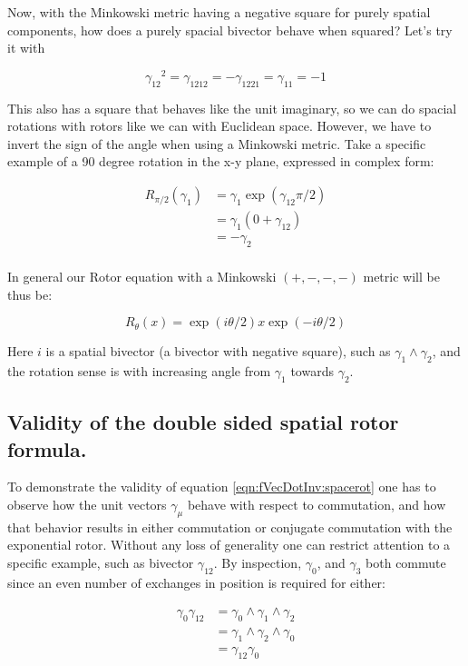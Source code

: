 Now, with the Minkowski metric having a negative square for purely spatial components, how does a purely spacial bivector behave when squared?  Let's try it with

\begin{equation*}
{\gamma_{12}}^2 
= \gamma_{1212}
= -\gamma_{1221}
= \gamma_{11}
= -1
\end{equation*}

This also has a square that behaves like the unit imaginary, so we can do spacial rotations with rotors like we can with Euclidean space.  However, we have to invert the sign of the angle when using a Minkowski metric.  Take a specific example of a 90 degree rotation in the x-y plane, expressed in complex form:

\begin{align*}
R_{\pi/2}(\gamma_1)
&= \gamma_1 \exp({ \gamma_{12} \pi/2 }) \\
&= \gamma_1 (0 + \gamma_{12}) \\
&= -\gamma_2 \\
\end{align*}

In general our Rotor equation with a Minkowski $(+,-,-,-)$ metric will be thus be:

\begin{equation}\label{eqn:fVecDotInv:spacerot}
R_{\theta}(x) = \exp( i\theta/2) x \exp( -i\theta/2)
\end{equation}

Here $i$ is a spatial bivector (a bivector with negative square), such as $\gamma_{1}\wedge\gamma_{2}$, and the rotation sense is with increasing angle from $\gamma_1$ towards $\gamma_2$.

\subsection{Validity of the double sided spatial rotor formula. }

To demonstrate the validity of equation \ref{eqn:fVecDotInv:spacerot} one has to observe how the unit vectors $\gamma_{\mu}$ behave with respect to commutation, and how that behavior results in either commutation or conjugate commutation with the exponential rotor.  Without any loss of generality one can restrict attention to a specific example, such as bivector $\gamma_{12}$.  By inspection, $\gamma_0$, and $\gamma_3$ both commute since an even number of exchanges in position is required for either:

\begin{align*}
\gamma_{0} \gamma_{12} 
&= \gamma_{0} \wedge \gamma_{1} \wedge \gamma_{2} \\
&= \gamma_{1} \wedge \gamma_{2} \wedge \gamma_{0} \\
&= \gamma_{12} \gamma_0
\end{align*}

